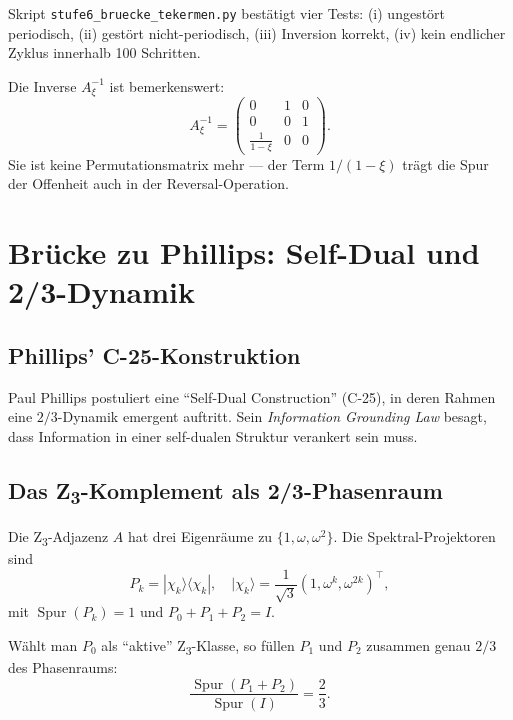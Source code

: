 Skript \texttt{stufe6\_bruecke\_tekermen.py} bestätigt vier Tests: (i) ungestört periodisch, (ii) gestört nicht-periodisch, (iii) Inversion korrekt, (iv) kein endlicher Zyklus innerhalb 100 Schritten.

Die Inverse \(A_\xi^{-1}\) ist bemerkenswert:
\begin{equation}
A_\xi^{-1} = \begin{pmatrix} 0 & 1 & 0 \\ 0 & 0 & 1 \\ \frac{1}{1-\xi} & 0 & 0 \end{pmatrix}.
\end{equation}
Sie ist keine Permutationsmatrix mehr — der Term \(1/(1-\xi)\) trägt die Spur der Offenheit auch in der Reversal-Operation.

\section{Brücke zu Phillips: Self-Dual und 2/3-Dynamik}
\label{sec:phillips}

\subsection{Phillips' C-25-Konstruktion}

Paul Phillips postuliert eine ``Self-Dual Construction'' (C-25), in deren Rahmen eine \(2/3\)-Dynamik emergent auftritt. Sein \emph{Information Grounding Law} besagt, dass Information in einer self-dualen Struktur verankert sein muss.

\subsection{Das Z\textsubscript{3}-Komplement als 2/3-Phasenraum}

Die Z\textsubscript{3}-Adjazenz \(A\) hat drei Eigenräume zu \(\{1, \omega, \omega^2\}\). Die Spektral-Projektoren sind
\begin{equation}
P_k = |\chi_k\rangle\langle\chi_k|, \quad |\chi_k\rangle = \frac{1}{\sqrt{3}}(1, \omega^k, \omega^{2k})^\top,
\end{equation}
mit \(\operatorname{Spur}(P_k) = 1\) und \(P_0 + P_1 + P_2 = I\).

\begin{keyresult}
Wählt man \(P_0\) als ``aktive'' Z\textsubscript{3}-Klasse, so füllen \(P_1\) und \(P_2\) zusammen genau \(2/3\) des Phasenraums:
\begin{equation}
\frac{\operatorname{Spur}(P_1 + P_2)}{\operatorname{Spur}(I)} = \frac{2}{3}.
\end{equation}
\end{keyresult}

